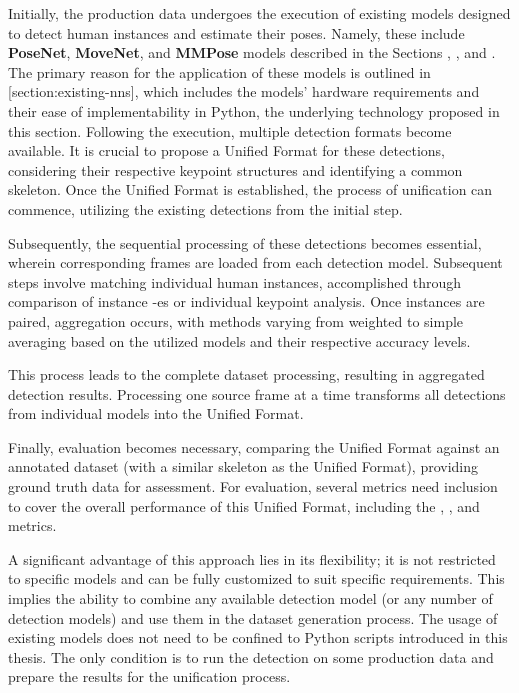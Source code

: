Initially, the production data undergoes the execution of existing models designed to detect human instances and estimate their poses. Namely, these include {\bf PoseNet}, {\bf MoveNet}, and {\bf MMPose} models described in the Sections , , and . The primary reason for the application of these models is outlined in [section:existing-nns], which includes the models' hardware requirements and their ease of implementability in Python, the underlying technology proposed in this section. Following the execution, multiple detection formats become available. It is crucial to propose a Unified Format for these detections, considering their respective keypoint structures and identifying a common skeleton. Once the Unified Format is established, the process of unification can commence, utilizing the existing detections from the initial step.

Subsequently, the sequential processing of these detections becomes essential, wherein corresponding frames are loaded from each detection model. Subsequent steps involve matching individual human instances, accomplished through comparison of instance {\bf \BBOX}-es or individual keypoint analysis. Once instances are paired, aggregation occurs, with methods varying from weighted to simple averaging based on the utilized models and their respective accuracy levels.

This process leads to the complete dataset processing, resulting in aggregated detection results. Processing one source frame at a time transforms all detections from individual models into the Unified Format.

Finally, evaluation becomes necessary, comparing the Unified Format against an annotated dataset (with a similar skeleton as the Unified Format), providing ground truth data for assessment. For evaluation, several metrics need inclusion to cover the overall performance of this Unified Format, including the {\bf \APE}, {\bf \MSE}, and {\bf \OKS} metrics.

A significant advantage of this approach lies in its flexibility; it is not restricted to specific models and can be fully customized to suit specific requirements. This implies the ability to combine any available detection model (or any number of detection models) and use them in the dataset generation process. The usage of existing models does not need to be confined to Python scripts introduced in this thesis. The only condition is to run the detection on some production data and prepare the results for the unification process.

